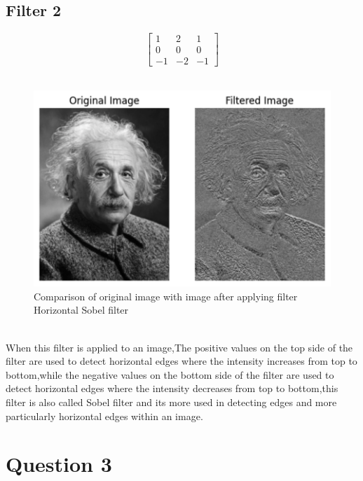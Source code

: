 \documentclass{assignment}
\begin{document}
\subsection{Filter 2}
\[
\begin{bmatrix} 1 & 2 & 1 \\ 0 & 0 & 0 \\ -1 & -2 & -1 \end{bmatrix}
\]
\\
\begin{figure}[h]
    \centering
    \includegraphics[width=0.5\linewidth]{2_2.png}
    \caption{Comparison of original image with image after applying filter Horizontal Sobel filter}
    \label{fig:enter-label}
\end{figure}
\\
When this filter is applied to an image,The positive values on the top side of the filter are used to detect horizontal edges where the intensity increases from top to bottom,while the negative values on the bottom side of the filter are used to detect horizontal edges where the intensity decreases from top to bottom,this filter is also called Sobel filter and its more used in detecting edges and more particularly horizontal edges within an image.
\section*{Question 3}
\end{document}
